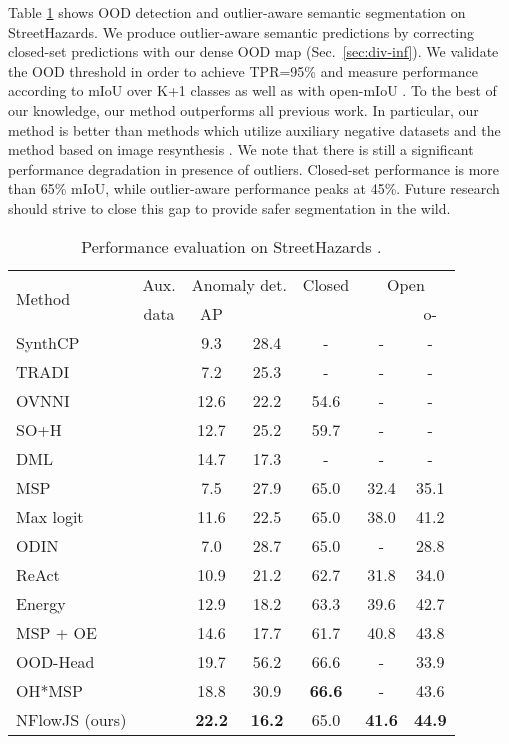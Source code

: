 \documentclass[lettersize,journal,hidelinks]{IEEEtran}
\newcommand{\cmark}{\ding{51}}
\newcommand{\xmark}{\ding{55}}
\begin{document}
Table \ref{table:osr_sh}  shows OOD detection and outlier-aware semantic segmentation on StreetHazards.
We produce outlier-aware semantic predictions  by correcting closed-set predictions with our dense OOD map (Sec.\ \ref{sec:div-inf}).
We validate the OOD threshold in order to achieve TPR=95\%  \cite{grcic22eccv} and measure performance according to mIoU over K+1 classes as well as with open-mIoU \cite{grcic22eccv}.
To the best of our knowledge, our method outperforms all previous work.
In particular, our method is better than  methods which utilize auxiliary negative datasets \cite{hendrycks19iclr,liu20neurips,bevandic19gcpr} and the method based on image resynthesis \cite{xia20eccv}.
We note that there is still a significant performance degradation in presence of outliers.
Closed-set performance is more than 65\% mIoU, while outlier-aware performance peaks at 45\%.
Future research should strive to close this gap to provide safer segmentation in the wild. 
\begin{table}[ht]
\centering
\caption{Performance evaluation on StreetHazards \cite{hendrycks19arxiv}.
}
\label{table:osr_sh}
\begin{tabular}{lcccccc}
\hline \hline
\multirow{2}{*}{Method} & \multicolumn{1}{c|}{Aux.} & \multicolumn{2}{c|}{Anomaly det.} & \multicolumn{1}{c|}{Closed} & \multicolumn{2}{c}{Open}\\
  & \multicolumn{1}{c|}{data}  &  AP         & \multicolumn{1}{c|}{}     & \multicolumn{1}{c|}{} &   & o- \\ \hline \hline
SynthCP \cite{xia20eccv} & \xmark &  9.3           & 28.4      & - &  -  & -\\
TRADI \cite{franchi20eccv} & \xmark &  7.2           & 25.3       & - & -  & - \\
OVNNI \cite{franchi20arxiv} & \xmark & 12.6  & 22.2  & 54.6 & - & - \\
SO+H \cite{grcic21visapp}& \xmark & 12.7  & 25.2  & 59.7 & - & - \\
DML \cite{cen21iccv} & \xmark  & 14.7  & 17.3  &  - & - & - \\
MSP \cite{hendrycks17iclr} & \xmark  &  7.5   &   27.9 & 65.0 & 32.4 & 35.1\\
Max logit \cite{hendrycks19arxiv} & \xmark  & 11.6   &  22.5   & 65.0  & 38.0 & 41.2\\
ODIN \cite{liang18iclr}&   \xmark   &    7.0       & 28.7 & 65.0  & - & 28.8\\
ReAct \cite{sun21neurips} & \xmark & 10.9  & 21.2 & 62.7 & 31.8 &  34.0\\
Energy \cite{liu20neurips}& \cmark &  12.9  & 18.2  & 63.3 & 39.6 &  42.7\\
MSP + OE \cite{hendrycks19iclr} & \cmark  &  14.6   &  17.7   & 61.7 & 40.8  & 43.8\\
OOD-Head \cite{bevandic19gcpr}  & \cmark   &  19.7 &  56.2   &  66.6 & - & 33.9\\
OH*MSP \cite{bevandic22ivc} & \cmark  & 18.8  & 30.9  &   \textbf{66.6}  & -  & 43.6\\
NFlowJS (ours) & \xmark &  \textbf{22.2}  & \textbf{16.2}  &  65.0 & \textbf{41.6} & \textbf{44.9} \\\hline
\end{tabular}
\end{table}
\end{document}
